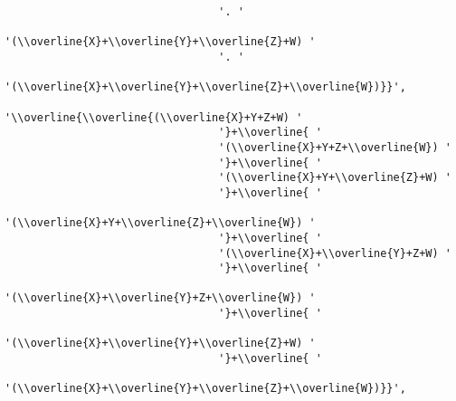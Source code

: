 \begin{verbatim}
                                 '. '
                                 '(\\overline{X}+\\overline{Y}+\\overline{Z}+W) '
                                 '. '
                                 '(\\overline{X}+\\overline{Y}+\\overline{Z}+\\overline{W})}}',
                                 '\\overline{\\overline{(\\overline{X}+Y+Z+W) '
                                 '}+\\overline{ '
                                 '(\\overline{X}+Y+Z+\\overline{W}) '
                                 '}+\\overline{ '
                                 '(\\overline{X}+Y+\\overline{Z}+W) '
                                 '}+\\overline{ '
                                 '(\\overline{X}+Y+\\overline{Z}+\\overline{W}) '
                                 '}+\\overline{ '
                                 '(\\overline{X}+\\overline{Y}+Z+W) '
                                 '}+\\overline{ '
                                 '(\\overline{X}+\\overline{Y}+Z+\\overline{W}) '
                                 '}+\\overline{ '
                                 '(\\overline{X}+\\overline{Y}+\\overline{Z}+W) '
                                 '}+\\overline{ '
                                 '(\\overline{X}+\\overline{Y}+\\overline{Z}+\\overline{W})}}',

\end{verbatim}
